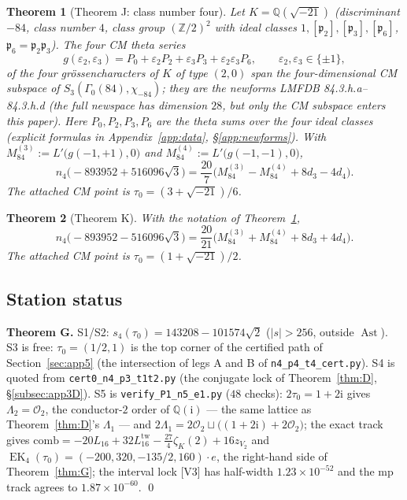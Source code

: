 \documentclass[11pt]{article}
\newcommand{\Qq}{\mathbb{Q}}
\newcommand{\Zz}{\mathbb{Z}}
\newcommand{\ii}{\mathrm{i}}
\newcommand{\OO}{\mathcal{O}}
\DeclareMathOperator{\EK}{EK}
\DeclareMathOperator{\Ast}{Ast}
\newtheorem{theorem}{Theorem}[section]
\theoremstyle{definition}
\theoremstyle{remark}
\begin{document}
\begin{theorem}[Theorem J: class number four]\label{thm:J}
Let $K=\Qq(\sqrt{-21})$ \textup{(}discriminant $-84$, class number
$4$, class group $(\Zz/2)^2$ with ideal classes
$1,[\mathfrak p_2],[\mathfrak p_3],[\mathfrak p_6]$,
$\mathfrak p_6=\mathfrak p_2\mathfrak p_3$\textup{)}. The four CM
theta series
\[
  g(\varepsilon_2,\varepsilon_3)
  =P_0+\varepsilon_2P_2+\varepsilon_3P_3+\varepsilon_2\varepsilon_3P_6,
  \qquad \varepsilon_2,\varepsilon_3\in\{\pm1\},
\]
of the four gr\"ossencharacters of $K$ of type $(2,0)$ span the
four-dimensional CM subspace of $S_3(\Gamma_0(84),\chi_{-84})$;
they are the newforms
\textup{LMFDB \textsf{84.3.h.a}--\textsf{84.3.h.d}} (the full
newspace has dimension $28$, but only the CM subspace enters this
paper). Here
$P_0,P_2,P_3,P_6$ are the theta sums over the four ideal classes
\textup{(}explicit formulas in
Appendix~\ref{app:data}, \S\ref{app:newforms}\textup{)}. With
$M_{84}^{(3)}:=L'\bigl(g(-1,+1),0\bigr)$ and
$M_{84}^{(4)}:=L'\bigl(g(-1,-1),0\bigr)$,
\[
  n_4\bigl(-893952+516096\sqrt3\bigr)
  =\frac{20}{7}\bigl(M_{84}^{(3)}-M_{84}^{(4)}+8d_3-4d_4\bigr).
\]
The attached CM point is $\tau_0=(3+\sqrt{-21})/6$.
\end{theorem}

\begin{theorem}[Theorem K]\label{thm:K}
With the notation of Theorem~\ref{thm:J},
\[
  n_4\bigl(-893952-516096\sqrt3\bigr)
  =\frac{20}{21}\bigl(M_{84}^{(3)}+M_{84}^{(4)}+8d_3+4d_4\bigr).
\]
The attached CM point is $\tau_0=(1+\sqrt{-21})/2$.
\end{theorem}

\subsection{Station status}\label{subsec:app6stations}

\textbf{Theorem G.} S1/S2: $s_4(\tau_0)=143208-101574\sqrt2$
($|s|>256$, outside $\Ast$). S3 is free: $\tau_0=(1/2,1)$ is the top
corner of the certified path of Section~\ref{sec:app5} (the
intersection of legs A and B of \texttt{n4\_p4\_t4\_cert.py}). S4 is
quoted from \texttt{cert0\_n4\_p3\_t1t2.py} (the conjugate lock of
Theorem~\ref{thm:D}, \S\ref{subsec:app3D}). S5 is
\texttt{verify\_P1\_n5\_e1.py} ($48$ checks): $2\tau_0=1+2\ii$ gives
$\Lambda_2=\OO_2$, the conductor-$2$ order of $\Qq(\ii)$ --- the
same lattice as Theorem~\ref{thm:D}'s $\Lambda_1$ --- and
$2\Lambda_1=2\OO_2\sqcup\bigl((1+2\ii)+2\OO_2\bigr)$; the exact
track gives
$\mathrm{comb}=-20L_{16}+32L_{16}^{\mathrm{tw}}-\tfrac{27}{4}\zeta_K(2)
+16z_{V_2}$ and
$\EK_4(\tau_0)=(-200,320,-135/2,160)\cdot e$, the right-hand side
of Theorem~\ref{thm:G}; the interval lock [V3] has half-width
$1.23\times10^{-52}$ and the mp track agrees to
$1.87\times10^{-60}$. \qed
\end{document}
